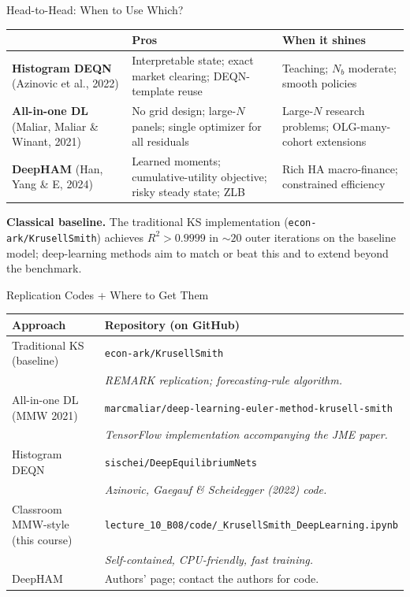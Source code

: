 \documentclass[aspectratio=169,11pt]{beamer}
\begin{document}
\begin{frame}{Head-to-Head: When to Use Which?}
\footnotesize
\begin{center}
\begin{tabular}{p{3.2cm} p{3.6cm} p{3.6cm}}
\toprule
 & \textbf{Pros} & \textbf{When it shines} \\
\midrule
\textbf{Histogram DEQN} (Azinovic et al., 2022) & Interpretable state; exact market clearing; DEQN-template reuse & Teaching; $N_b$ moderate; smooth policies \\
\addlinespace
\textbf{All-in-one DL} (Maliar, Maliar \& Winant, 2021) & No grid design; large-$N$ panels; single optimizer for all residuals & Large-$N$ research problems; OLG-many-cohort extensions \\
\addlinespace
\textbf{DeepHAM} (Han, Yang \& E, 2024) & Learned moments; cumulative-utility objective; risky steady state; ZLB & Rich HA macro-finance; constrained efficiency \\
\bottomrule
\end{tabular}
\end{center}

\vspace{0.2em}
{\scriptsize \textbf{Classical baseline.} The traditional KS implementation (\texttt{econ-ark/KrusellSmith}) achieves $R^2 > 0.9999$ in $\sim 20$ outer iterations on the baseline model; deep-learning methods aim to match or beat this and to extend beyond the benchmark.}
\end{frame}

\begin{frame}{Replication Codes + Where to Get Them}
\scriptsize
\begin{center}
\begin{tabular}{p{3.3cm} p{7.5cm}}
\toprule
\textbf{Approach} & \textbf{Repository (on GitHub)} \\
\midrule
Traditional KS (baseline) & \texttt{econ-ark/KrusellSmith} \\
& \quad\emph{REMARK replication; forecasting-rule algorithm.} \\
\addlinespace
All-in-one DL (MMW 2021) & \texttt{marcmaliar/deep-learning-\allowbreak euler-method-\allowbreak krusell-smith} \\
& \quad\emph{TensorFlow implementation accompanying the JME paper.} \\
\addlinespace
Histogram DEQN & \texttt{sischei/DeepEquilibriumNets} \\
& \quad\emph{Azinovic, Gaegauf \& Scheidegger (2022) code.} \\
\addlinespace
Classroom MMW-style (this course) & \texttt{lecture\_10\_B08/\allowbreak code/\allowbreak 12\_KrusellSmith\_\allowbreak DeepLearning.ipynb} \\
& \quad\emph{Self-contained, CPU-friendly, fast training.} \\
\addlinespace
DeepHAM & Authors' page; contact the authors for code. \\
\bottomrule
\end{tabular}
\end{center}
\end{frame}
\end{document}
